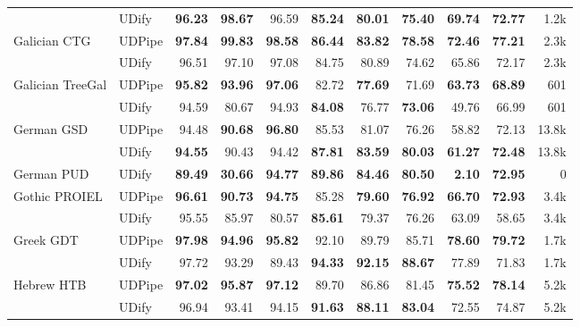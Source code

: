 \documentclass[11pt,a4paper]{article}
\begin{document}
\begin{table*}
\begin{center}
\begin{tabular}{@{}llrrrrrrrrr@{}}
               & UDify &  \bf 96.23 &  \bf 98.67 &       96.59 &  \bf 85.24 &  \bf 80.01 &  \bf 75.40 &  \bf 69.74 &  \bf 72.77 &   1.2k \\
    \addlinespace
    Galician CTG & UDPipe &  \bf 97.84 &  \bf 99.83 &   \bf 98.58 &  \bf 86.44 &  \bf 83.82 &  \bf 78.58 &  \bf 72.46 &  \bf 77.21 &   2.3k \\
               & UDify &      96.51 &      97.10 &       97.08 &      84.75 &      80.89 &      74.62 &      65.86 &      72.17 &   2.3k \\
    \addlinespace
    Galician TreeGal & UDPipe &  \bf 95.82 &  \bf 93.96 &   \bf 97.06 &      82.72 &  \bf 77.69 &      71.69 &  \bf 63.73 &  \bf 68.89 &    601 \\
               & UDify &      94.59 &      80.67 &       94.93 &  \bf 84.08 &      76.77 &  \bf 73.06 &      49.76 &      66.99 &    601 \\
    \addlinespace
    German GSD & UDPipe &      94.48 &  \bf 90.68 &   \bf 96.80 &      85.53 &      81.07 &      76.26 &      58.82 &      72.13 &  13.8k \\
               & UDify &  \bf 94.55 &      90.43 &       94.42 &  \bf 87.81 &  \bf 83.59 &  \bf 80.03 &  \bf 61.27 &  \bf 72.48 &  13.8k \\
    \addlinespace
    German PUD & UDify &  \bf 89.49 &  \bf 30.66 &   \bf 94.77 &  \bf 89.86 &  \bf 84.46 &  \bf 80.50 &   \bf 2.10 &  \bf 72.95 &      0 \\
    \addlinespace
    Gothic PROIEL & UDPipe &  \bf 96.61 &  \bf 90.73 &   \bf 94.75 &      85.28 &  \bf 79.60 &  \bf 76.92 &  \bf 66.70 &  \bf 72.93 &   3.4k \\
               & UDify &      95.55 &      85.97 &       80.57 &  \bf 85.61 &      79.37 &      76.26 &      63.09 &      58.65 &   3.4k \\
    \addlinespace
    Greek GDT & UDPipe &  \bf 97.98 &  \bf 94.96 &   \bf 95.82 &      92.10 &      89.79 &      85.71 &  \bf 78.60 &  \bf 79.72 &   1.7k \\
               & UDify &      97.72 &      93.29 &       89.43 &  \bf 94.33 &  \bf 92.15 &  \bf 88.67 &      77.89 &      71.83 &   1.7k \\
    \addlinespace
    Hebrew HTB & UDPipe &  \bf 97.02 &  \bf 95.87 &   \bf 97.12 &      89.70 &      86.86 &      81.45 &  \bf 75.52 &  \bf 78.14 &   5.2k \\
               & UDify &      96.94 &      93.41 &       94.15 &  \bf 91.63 &  \bf 88.11 &  \bf 83.04 &      72.55 &      74.87 &   5.2k \\

\end{tabular}
\end{center}
\end{table*}
\end{document}
